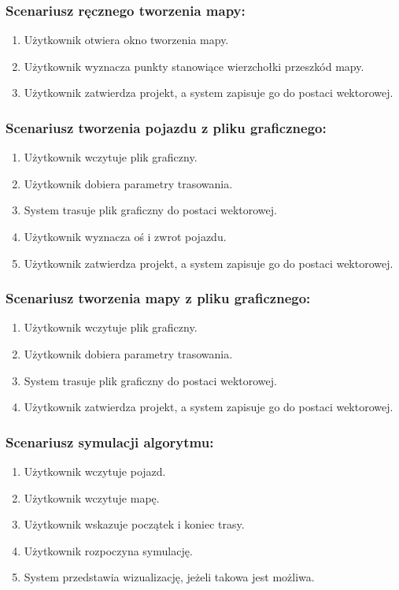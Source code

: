 \documentclass{article}
\begin{document}
\subsubsection{Scenariusz ręcznego tworzenia mapy:}
\begin{enumerate}
  \item Użytkownik otwiera okno tworzenia mapy.
  \item Użytkownik wyznacza punkty stanowiące wierzchołki przeszkód mapy.
  \item Użytkownik zatwierdza projekt, a system zapisuje go do postaci wektorowej.
\end{enumerate}

\subsubsection{Scenariusz tworzenia pojazdu z pliku graficznego:}
\begin{enumerate}
  \item Użytkownik wczytuje plik graficzny.
  \item Użytkownik dobiera parametry trasowania.
  \item System trasuje plik graficzny do postaci wektorowej.
  \item Użytkownik wyznacza oś i zwrot pojazdu.
  \item Użytkownik zatwierdza projekt, a system zapisuje go do postaci wektorowej.
\end{enumerate}

\subsubsection{Scenariusz tworzenia mapy z pliku graficznego:}
\begin{enumerate}
  \item Użytkownik wczytuje plik graficzny.
  \item Użytkownik dobiera parametry trasowania.
  \item System trasuje plik graficzny do postaci wektorowej.
  \item Użytkownik zatwierdza projekt, a system zapisuje go do postaci wektorowej.
\end{enumerate}

\subsubsection{Scenariusz symulacji algorytmu:}
\begin{enumerate}
  \item Użytkownik wczytuje pojazd.
  \item Użytkownik wczytuje mapę.
  \item Użytkownik wskazuje początek i koniec trasy.
  \item Użytkownik rozpoczyna symulację.
  \item System przedstawia wizualizację, jeżeli takowa jest możliwa.
\end{enumerate}
\end{document}
